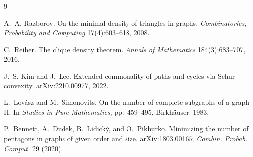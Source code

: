 \documentclass[11pt]{article}
\begin{document}
\begin{thebibliography}{9}

A.~A. Razborov.
\newblock On the minimal density of triangles in graphs.
\newblock \emph{Combinatorics, Probability and Computing} 17(4):603--618, 2008.

C.~Reiher.
\newblock The clique density theorem.
\newblock \emph{Annals of Mathematics} 184(3):683--707, 2016.

J.~S. Kim and J.~Lee.
\newblock Extended commonality of paths and cycles via Schur convexity.
\newblock arXiv:2210.00977, 2022.

L.~Lov\'asz and M.~Simonovits.
\newblock On the number of complete subgraphs of a graph II.
\newblock In \emph{Studies in Pure Mathematics}, pp.\ 459--495, Birkh\"auser, 1983.

P.~Bennett, A.~Dudek, B.~Lidick\'y, and O.~Pikhurko.
\newblock Minimizing the number of pentagons in graphs of given order and size.
\newblock arXiv:1803.00165; \emph{Combin. Probab. Comput.} 29 (2020).

\end{thebibliography}
\end{document}

